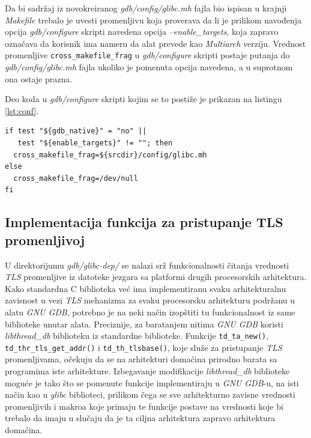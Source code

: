 \documentclass[12pt,oneside]{memoir}
\begin{document}
Da bi sadržaj iz novokreiranog \emph{gdb/config/glibc.mh} fajla bio ispisan u krajnji \emph{Makefile} trebalo je uvesti promenljivu koja proverava da li je prilikom navođenja opcija \emph{gdb/configure} skripti navedena opcija \emph{--enable\_targets}, koja zapravo označava da korisnik ima nameru da alat prevede kao \emph{Multiarch} verziju. Vrednost promenljive \texttt{cross\_makefile\_frag} u \emph{gdb/configure} skripti postaje putanja do \emph{gdb/config/glibc.mh} fajla ukoliko je pomenuta opcija navedena, a u suprotnom ona ostaje prazna.

Deo koda u \emph{gdb/configure} skripti kojim se to postiže je prikazan na listingu \ref{lst:conf}.
\begin{lstlisting}[label={lst:conf}, caption={Izmena \emph{gdb/configure} fajla.}]
if test "${gdb_native}" = "no" ||
   test "${enable_targets}" != ""; then
  cross_makefile_frag=${srcdir}/config/glibc.mh
else
  cross_makefile_frag=/dev/null
fi
\end{lstlisting}

\subsection{Implementacija funkcija za pristupanje TLS promenljivoj}

U direktorijumu \emph{gdb/glibc-dep/} se nalazi srž funkcionalnosti čitanja vrednosti \emph{TLS} promenljive iz datoteke jezgara sa platformi drugih procesorskih arhitektura. Kako standardna C biblioteka već ima implementiranu svaku arhitekturalnu zavisnost u vezi \emph{TLS} mehanizma za svaku procesorsku arhitekturu podržanu u alatu \emph{GNU GDB}, potrebno je na neki način izopštiti tu funkcionalnost iz same biblioteke unutar alata. Preciznije, za baratanjem nitima \emph{GNU GDB} koristi \emph{libthread\_db} biblioteku iz standardne biblioteke. Funkcije \texttt{td\_ta\_new()}, \texttt{td\_thr\_tls\_get\_addr()} i \texttt{td\_th\_tlsbase()}, koje služe za pristupanje \emph{TLS} promenljivama, očekuju da se na arhitekturi domaćina prirodno barata sa programima iste arhitekture. Izbegavanje modifikacije \emph{libthread\_db} biblioteke moguće je tako što se pomenute funkcije implementiraju u \emph{GNU GDB}-u, na isti način kao u \emph{glibc} biblioteci, prilikom čega se sve arhitekturno zavisne vrednosti promenljivih i makroa koje primaju te funkcije postave na vrednosti koje bi trebalo da imaju u slučaju da je ta ciljna arhitektura zapravo arhitektura domaćina.
\end{document}
